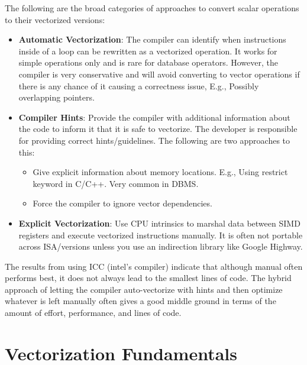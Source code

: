 \documentclass[11pt]{article}
\begin{document}
The following are the broad categories of approaches to convert scalar operations to their vectorized versions:
\begin{itemize}
	\item  
	\textbf{Automatic Vectorization}:
	The compiler can identify when instructions inside of a loop can be rewritten as a vectorized operation. It works for simple operations only and is rare for database operators. However, the compiler is very conservative and will avoid converting to vector operations if there is any chance of it causing a correctness issue, E.g., Possibly overlapping pointers.
	
	\item  
	\textbf{Compiler Hints}:
	Provide the compiler with additional information about the code to inform it that it is safe to vectorize. The developer is responsible for providing correct hints/guidelines.
	The following are two approaches to this:
        \begin{itemize}
            \item Give explicit information about memory locations. E.g., Using restrict keyword in C/C++. Very common in DBMS.
	    \item Force the compiler to ignore vector dependencies. 
        \end{itemize}
	
	
	\item  
	\textbf{Explicit Vectorization}:
	Use CPU intrinsics to marshal data between SIMD registers and execute vectorized instructions manually. It is often not portable across ISA/versions unless you use an indirection library like Google Highway.
	
\end{itemize}

The results from \cite{10.14778/3275366.3284966} using ICC (intel's compiler) indicate that although manual often performs best, it does not always lead to the smallest lines of code. The hybrid approach of letting the compiler auto-vectorize with hints and then optimize whatever is left manually often gives a good middle ground in terms of the amount of effort, performance, and lines of code.

\section{Vectorization Fundamentals}
\label{fund}
\end{document}
